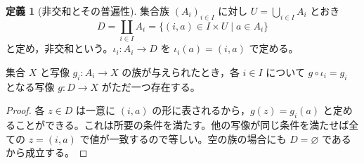 \documentclass[a5paper,10pt,dvipdfmx]{jsarticle}
\theoremstyle{definition}
\newtheorem{defn}[ruledef]{定義}
\theoremstyle{plain}
\begin{document}
\begin{defn}[非交和とその普遍性]\label{k49}
集合族 $(A_i)_{i\in I}$ に対し $U=\bigcup_{i\in I}A_i$ とおき
\[
 D=\coprod_{i\in I}A_i=\{(i,a)\in I\times U\mid a\in A_i\}
\]
と定め，非交和という。$\iota_i:A_i\to D$ を $\iota_i(a)=(i,a)$ で定める。
\end{defn}
集合 $X$ と写像 $g_i:A_i\to X$ の族が与えられたとき，各 $i\in I$ について $g\circ\iota_i=g_i$ となる写像 $g:D\to X$ がただ一つ存在する。
\begin{proof}
各 $z\in D$ は一意に $(i,a)$ の形に表されるから，$g(z)=g_i(a)$ と定めることができる。これは所要の条件を満たす。他の写像が同じ条件を満たせば全ての $z=(i,a)$ で値が一致するので等しい。空の族の場合にも $D=\varnothing$ であるから成立する。
\end{proof}
\end{document}
